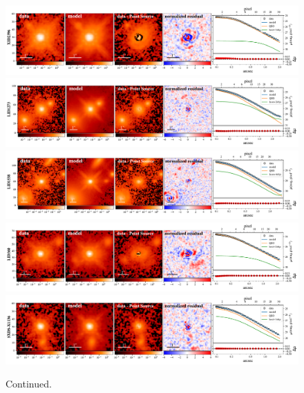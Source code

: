 \documentclass[apj]{emulateapj}
\begin{document}
\begin{figure}
\centering
{
\includegraphics[height=0.25\textwidth]{fig/best_fit_XID2396_SB_profile.pdf}
\includegraphics[height=0.25\textwidth]{fig/best_fit_LID1273_SB_profile.pdf}
\includegraphics[height=0.25\textwidth]{fig/best_fit_LID1538_SB_profile.pdf}
\includegraphics[height=0.25\textwidth]{fig/best_fit_LID360_SB_profile.pdf}
\includegraphics[height=0.25\textwidth]{fig/best_fit_SXDS-X1136_SB_profile.pdf}
}
\caption{Continued.}
\end{figure} 
\end{document}
